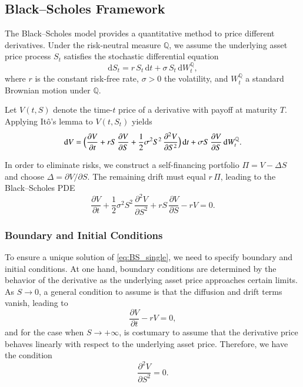 \documentclass[12pt]{report} %
\theoremstyle{plain}           %
\theoremstyle{definition}      %
\theoremstyle{remark}          %
\begin{document}
\subsection{Black–Scholes Framework}
The Black–Scholes model \cite{blackscholes} provides a quantitative method to price different derivatives. 
Under the risk-neutral measure $\mathbb{Q}$, we assume the underlying asset 
price process $S_t$ satisfies the stochastic differential equation
\begin{equation}
  \mathrm{d}S_t = r\,S_t\,\mathrm{d}t + \sigma\,S_t\,\mathrm{d}W_t^{\mathbb{Q}},
  \label{eq:gbm_single}
\end{equation}
where $r$ is the constant risk-free rate, $\sigma>0$ 
the volatility, and $W_t^{\mathbb{Q}}$ a standard Brownian motion under $\mathbb{Q}$.  

Let $V(t,S)$ denote the time-$t$ price of a derivative with payoff at maturity $T$.  Applying Itô’s lemma to $V(t,S_t)$ yields
\begin{equation}
  \mathrm{d}V = \Bigl(
    \frac{\partial V}{\partial t} + r S\,\frac{\partial V}{\partial S} + \frac{1}{2}\sigma^2 S^2\,\frac{\partial^2 V}{\partial S^2}
  \Bigr)\,\mathrm{d}t
  + \sigma S\,\frac{\partial V}{\partial S}\,\mathrm{d}W_t^{\mathbb{Q}}.
  \label{eq:ito_single}
\end{equation}

In order to eliminate risks, we construct a self-financing portfolio $\Pi = V - \Delta S$ and choose $\Delta = \partial V/\partial S$.  
The remaining drift must equal $r\,\Pi$, leading to the Black–Scholes PDE
\begin{equation}
  \frac{\partial V}{\partial t} + \frac{1}{2}\sigma^2 S^2\,\frac{\partial^2 V}{\partial S^2}
  + r S\,\frac{\partial V}{\partial S} - r V = 0.
  \label{eq:BS_single}
\end{equation}

\subsubsection{Boundary and Initial Conditions}
To ensure a unique solution of \eqref{eq:BS_single}, 
we need to specify boundary and initial conditions. At one hand, boundary conditions are determined by the behavior of the derivative as the underlying asset price approaches certain limits.
As $S\to0$, a general condition \cite{Wilmott2010PaulWO} to assume is that the diffusion and drift terms vanish, leading to
\begin{equation}
  \frac{\partial V}{\partial t} - rV = 0,
\end{equation}
and for the case when $S\to+\infty$, is costumary to assume that the derivative price behaves linearly with respect to the underlying asset price. Therefore,
we have the condition
\begin{equation}
  \frac{\partial^2 V}{\partial S^2} = 0.
\end{equation}
\end{document}
